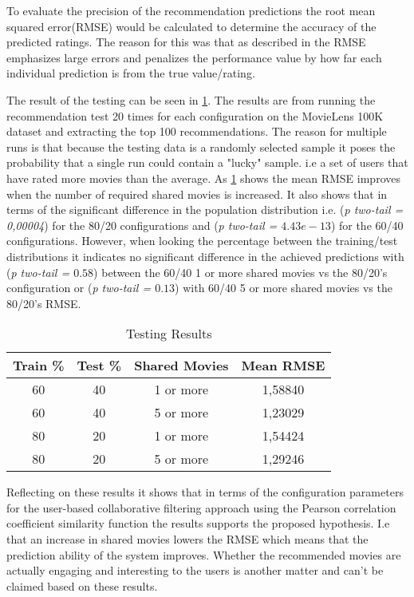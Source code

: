 To evaluate the precision of the recommendation predictions the root mean squared error(RMSE) would be calculated to determine the accuracy of the predicted ratings. The reason for this was that as described in \cite{Schafer2007} the RMSE emphasizes large errors and penalizes the performance value by how far each individual prediction is from the true value/rating.

The result of the testing can be seen in \ref{table:results}. The results are from running the recommendation test 20 times for each configuration on the MovieLens 100K dataset and extracting the top 100 recommendations. The reason for multiple runs is that because the testing data is a randomly selected sample it poses the probability that a single run could contain a "lucky" sample. i.e a set of users that have rated more movies than the average.
 As \ref{table:results} shows the mean RMSE improves when the number of required shared movies is increased. It also shows that in terms of the significant difference in the population distribution i.e. (\textit{p two-tail = 0,00004}) for the 80/20 configurations and (\textit{p two-tail = $4.43e-13$}) for the 60/40 configurations. However, when looking the percentage between the training/test distributions it indicates no significant difference in the achieved predictions with (\textit{p two-tail = $0.58$}) between the 60/40 1 or more shared movies vs the 80/20's configuration or (\textit{p two-tail = $0.13$}) with 60/40 5 or more shared movies vs the 80/20's RMSE.

\begin{table}[H]
	\caption{\label{table} Testing Results}
	\centering
	\label{table:results}
	\begin{tabular}{c c c c}
		\hline
		Train \% & Test \% & Shared Movies & Mean RMSE  \\
		\hline
		60 & 40 & 1 or more &  1,58840 \\
		60 & 40 & 5 or more &  1,23029 \\
		80 & 20 & 1 or more &  1,54424 \\
		80 & 20 & 5 or more &  1,29246 \\
		\hline
	\end{tabular}
\end{table} 

Reflecting on these results it shows that in terms of the configuration parameters for the user-based collaborative filtering approach using the Pearson correlation coefficient similarity function the results supports the proposed hypothesis. I.e that an increase in shared movies lowers the RMSE which means that the prediction ability of the system improves. Whether the recommended movies are actually engaging and interesting to the users is another matter and can't be claimed based on these results.

